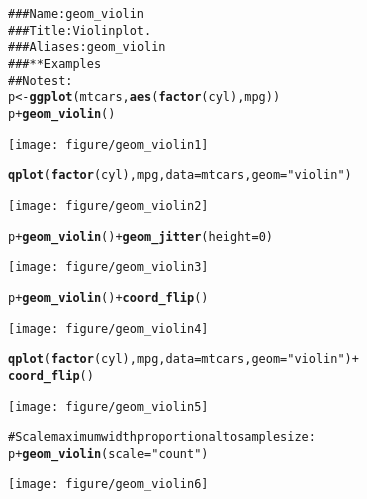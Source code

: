 \documentclass[a4paper,titlepage]{tufte-handout}\usepackage{graphicx, color}
\makeatletter
\def\maxwidth{ %
  \ifdim\Gin@nat@width>\linewidth
    \linewidth
  \else
    \Gin@nat@width
  \fi
}
\newcommand{\hlfunctioncall}[1]{\textcolor[rgb]{0.501960784313725,0,0.329411764705882}{\textbf{#1}}}%
\newcommand{\hlstring}[1]{\textcolor[rgb]{0.6,0.6,1}{#1}}%
\newcommand{\hlcomment}[1]{\textcolor[rgb]{0.180392156862745,0.6,0.341176470588235}{#1}}%
\newenvironment{kframe}{%
 \def\at@end@of@kframe{}%
 \ifinner\ifhmode%
  \def\at@end@of@kframe{\end{minipage}}%
  \begin{minipage}{\columnwidth}%
 \fi\fi%
 \def\FrameCommand##1{\hskip\@totalleftmargin \hskip-\fboxsep
 \colorbox{shadecolor}{##1}\hskip-\fboxsep
     \hskip-\linewidth \hskip-\@totalleftmargin \hskip\columnwidth}%
 \MakeFramed {\advance\hsize-\width
   \@totalleftmargin\z@ \linewidth\hsize
   \@setminipage}}%
 {\par\unskip\endMakeFramed%
 \at@end@of@kframe}
\newenvironment{knitrout}{}{} %
\makeatother
\begin{document}
\begin{knitrout}
\color{fgcolor}\begin{kframe}
\begin{alltt}
\hlcomment{### Name: geom_violin}
\hlcomment{### Title: Violin plot.}
\hlcomment{### Aliases: geom_violin}
\hlcomment{### ** Examples}
\hlcomment{## No test: }
p <- \hlfunctioncall{ggplot}(mtcars, \hlfunctioncall{aes}(\hlfunctioncall{factor}(cyl), mpg))
p + \hlfunctioncall{geom_violin}()
\end{alltt}
\end{kframe}\texttt{[image: figure/geom\_violin1]} \begin{kframe}\begin{alltt}
\hlfunctioncall{qplot}(\hlfunctioncall{factor}(cyl), mpg, data = mtcars, geom = \hlstring{"violin"})
\end{alltt}
\end{kframe}\texttt{[image: figure/geom\_violin2]} \begin{kframe}\begin{alltt}
p + \hlfunctioncall{geom_violin}() + \hlfunctioncall{geom_jitter}(height = 0)
\end{alltt}
\end{kframe}\texttt{[image: figure/geom\_violin3]} \begin{kframe}\begin{alltt}
p + \hlfunctioncall{geom_violin}() + \hlfunctioncall{coord_flip}()
\end{alltt}
\end{kframe}\texttt{[image: figure/geom\_violin4]} \begin{kframe}\begin{alltt}
\hlfunctioncall{qplot}(\hlfunctioncall{factor}(cyl), mpg, data = mtcars, geom = \hlstring{"violin"}) +
  \hlfunctioncall{coord_flip}()
\end{alltt}
\end{kframe}\texttt{[image: figure/geom\_violin5]} \begin{kframe}\begin{alltt}
\hlcomment{# Scale maximum width proportional to sample size:}
p + \hlfunctioncall{geom_violin}(scale = \hlstring{"count"})
\end{alltt}
\end{kframe}\texttt{[image: figure/geom\_violin6]} \begin{kframe}\begin{alltt}

\end{alltt}
\end{kframe}
\end{knitrout}
\end{document}
